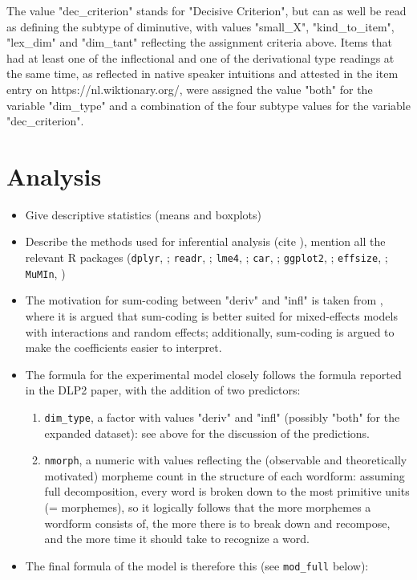The value "dec\_criterion" stands for "Decisive Criterion", but can as well be read as defining the subtype of diminutive, with values "small\_X", "kind\_to\_item", "lex\_dim" and "dim\_tant" reflecting the assignment criteria above. Items that had at least one of the inflectional and one of the derivational type readings at the same time, as reflected in native speaker intuitions and attested in the item entry on https://nl.wiktionary.org/, were assigned the value "both" for the variable "dim\_type" and a combination of the four subtype values for the variable "dec\_criterion".

\section{Analysis}
\begin{itemize}
\item Give descriptive statistics (means and boxplots)
\item Describe the methods used for inferential analysis (cite \cite{Winter+2019}), mention all the relevant R packages (\texttt{dplyr}, \cite{dplyr+2022}; \texttt{readr}, \cite{readr+2022}; \texttt{lme4}, \cite{lme4+2015}; \texttt{car}, \cite{car+2019}; \texttt{ggplot2}, \cite{ggplot2+2016}; \texttt{effsize}, \cite{effsize+2020}; \texttt{MuMIn}, \cite{MuMIn+2022})
\item The motivation for sum-coding between "deriv" and "infl" is taken from \cite{Winter+2019}, where it is argued that sum-coding is better suited for mixed-effects models with interactions and random effects; additionally, sum-coding is argued to make the coefficients easier to interpret.
\item The formula for the experimental model closely follows the formula reported in the DLP2 paper, with the addition of two predictors:
\begin{enumerate}
    \item \texttt{dim\_type}, a factor with values "deriv" and "infl" (possibly "both" for the expanded dataset): see above for the discussion of the predictions.
    \item \texttt{nmorph}, a numeric with values reflecting the (observable and theoretically motivated) morpheme count in the structure of each wordform: assuming full decomposition, every word is broken down to the most primitive units (= morphemes), so it logically follows that the more morphemes a wordform consists of, the more there is to break down and recompose, and the more time it should take to recognize a word.
\end{enumerate} 
\item The final formula of the model is therefore this (see \texttt{mod\_full} below):
\end{itemize}